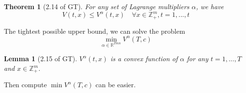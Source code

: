 \documentclass[11pt,a4paper]{article}
\newtheorem{theorem}{Theorem}
\newtheorem{lemma}{Lemma}
\begin{document}
\begin{theorem}[2.14 of GT]
    For any set of Lagrange multipliers $\alpha$, we have
    $$V(t,x)\leq V^{\alpha}(t,x)\quad \forall x\in \mathbb{Z}_+^m,t=1,...,t$$
\end{theorem}

The tightest possible upper bound, we can solve the problem$$\min_{\alpha\in \mathbb{R}^{Tmn}} V^{\alpha}(T,c)$$

\begin{lemma}[2.15 of GT]
    $V^{\alpha}(t,x)$ is a convex function of $\alpha$ for any $t=1,...,T$ and $x\in \mathbb{Z}_+^m$.
\end{lemma}
Then compute $\min V^{\alpha}(T,c)$ can be easier.
\end{document}
